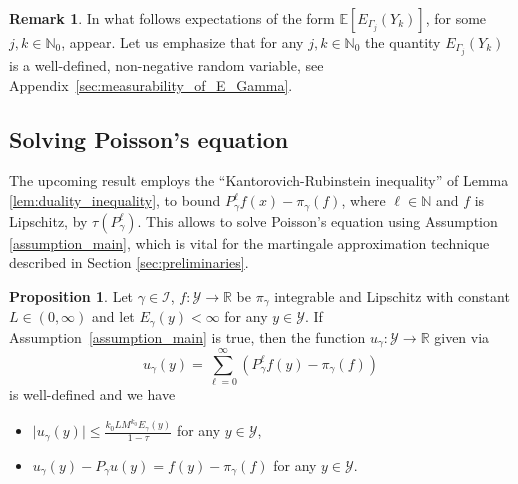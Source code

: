 \documentclass[12pt]{article}
\theoremstyle{definition}
\newtheorem{rem}[thm]{Remark}
\newtheorem{prop}[thm]{Proposition}
\newcommand{\N}{\mathbb{N}}
\newcommand{\E}{\mathbb{E}}
\newcommand{\R}{\mathbb{R}}
\newcommand{\cY}{\mathcal{Y}}
\begin{document}
\begin{rem}
	In what follows expectations of the form  $\E [E_{\Gamma_{j}}(Y_k)]$, for some $j,k \in \N_0$, appear.
	Let us emphasize that for any $j, k \in \N_0$ the quantity $E_{\Gamma_{j}}(Y_k)$ is a well-defined, non-negative random variable, see  Appendix~\ref{sec:measurability_of_E_Gamma}. 
\end{rem}
\subsection{Solving Poisson's equation}
The upcoming result employs the ``Kantorovich-Rubinstein inequality'' of Lemma \ref{lem:duality_inequality}, to bound $P_\gamma^\ell f(x) - \pi_\gamma(f)$, where $\ell \in \N$ and $f$ is Lipschitz, by $\tau(P_\gamma^\ell)$. 
	This allows to solve Poisson's equation using Assumption \ref{assumption_main}, which is vital for the martingale approximation technique described in Section \ref{sec:preliminaries}. 

\begin{prop}\label{prop:poisson_equation_wasserstein_setting}
	Let $\gamma \in \mathcal{I}$, $f \colon \cY \to \R$ be $\pi_\gamma$ integrable and Lipschitz with constant $L \in (0, \infty)$ and let $E_\gamma (y) < \infty$ for any $y \in \cY$. 
	If Assumption~\ref{assumption_main} is true, then the function $u_\gamma\colon \cY \to \R$ given via 
	\[
	u_\gamma(y ) = \sum_{\ell=0}^\infty ( P_\gamma^\ell  f(y) - \pi_\gamma(f)) 
	\]   
	is well-defined and we have
	\begin{itemize}
		\item[i)] $\vert u_\gamma (y) \vert \leq \frac{k_0L M^{k_0} E_\gamma(y)}{1- \tau}$ for any $y \in \cY$,
		\item[ii)] $u_\gamma (y) - P_\gamma u(y) = f(y) - \pi_\gamma(f)$ for any $y \in \cY$.
	\end{itemize}
\end{prop}
\end{document}

